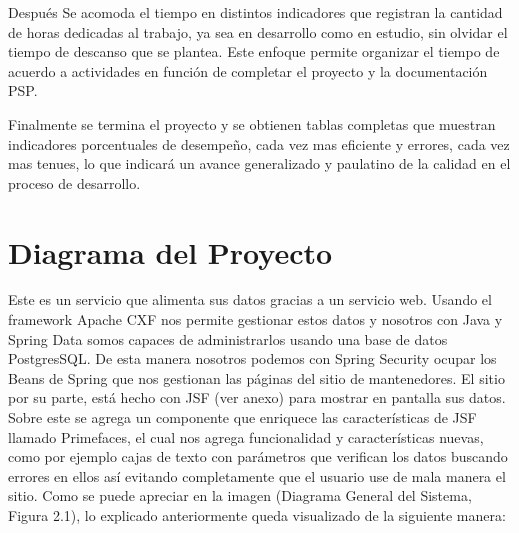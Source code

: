 \documentclass[a4paper,12pt,openany,oneside]{book}
\begin{document}
Después Se acomoda el tiempo en distintos indicadores que registran la cantidad de horas dedicadas al trabajo, ya sea en desarrollo como en estudio, sin olvidar el tiempo de descanso que se plantea. Este enfoque permite organizar el tiempo de acuerdo a actividades en función de completar el proyecto y la documentación PSP.

Finalmente se termina el proyecto y se obtienen tablas completas que muestran indicadores porcentuales de desempeño, cada vez mas eficiente y errores, cada vez mas tenues, lo que indicará un avance generalizado y paulatino de la calidad en el proceso de desarrollo.
\section{Diagrama del Proyecto}
Este es un servicio que alimenta sus datos gracias a un servicio web. Usando el framework Apache CXF nos permite gestionar estos datos y nosotros con Java y Spring Data somos capaces de administrarlos usando una base de datos PostgresSQL. De esta manera nosotros podemos con Spring Security ocupar los Beans de Spring que nos gestionan las páginas del sitio de mantenedores. El sitio por su parte, está hecho con JSF (ver anexo) para mostrar en pantalla sus datos. Sobre este se agrega un componente que enriquece las características de JSF llamado Primefaces, el cual nos agrega funcionalidad y características nuevas, como por ejemplo cajas de texto con parámetros que verifican los datos buscando errores en ellos así evitando completamente que el usuario use de mala manera el sitio. Como se puede apreciar en la imagen (Diagrama General del Sistema, Figura 2.1), lo explicado anteriormente queda visualizado de la siguiente manera:
\end{document}
